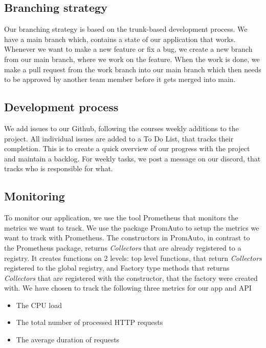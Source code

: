 \subsection{Branching strategy}
Our branching strategy is based on the trunk-based development process.
We have a main branch which, contains a state of our application that works. Whenever we want to make a new feature or fix a bug, we create a new branch from our main branch, where we work on the feature. When the work is done, we make a pull request from the work branch into our main branch which then needs to be approved by another team member before it gets merged into main.

\subsection{Development process}
We add issues to our Github, following the courses weekly additions to the project. All individual issues are added to a To Do List, that tracks their completion. This is to create a quick overview of our progress with the project and maintain a backlog.
For weekly tasks, we post a message on our discord, that tracks who is responsible for what.


\subsection{Monitoring}\label{Monitoring}

To monitor our application, we use the tool Prometheus that monitors the metrics we want to track. 
We use the package PromAuto to setup the metrics we want to track with Prometheus. The constructors in PromAuto, in contrast to the Prometheus package, returns \textit{Collectors} that are already registered to a registry. It creates functions on 2 levels: top level functions, that return \textit{Collectors} registered to the global registry, and Factory type methods that returns \textit{Collectors} that are registered with the constructor, that the factory were created with.
\newline
We have chosen to track the following three metrics for our app and API
\begin{itemize}
    \item The CPU load
    \item The total number of processed HTTP requests
    \item The average duration of requests
\end{itemize}


